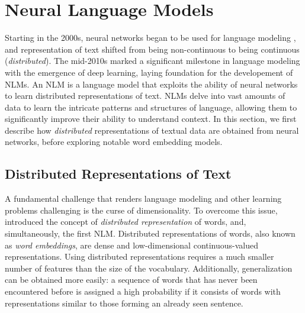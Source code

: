 \section{Neural Language Models}

Starting in the 2000s, neural networks began to be used for language modeling \citep{bengio2000neural}, and representation of text shifted from being non-continuous to being continuous (\textit{distributed}). The mid-2010s marked a significant milestone in language modeling with the emergence of deep learning, laying foundation for the developement of \acp{NLM}. An \ac{NLM} is a language model that exploits the ability of neural networks to learn distributed representations of text. \acp{NLM} delve into vast amounts of data to learn the intricate patterns and structures of language, allowing them to significantly improve their ability to understand context. In this section, we first describe how \textit{distributed} representations of textual data are obtained from neural networks, before exploring notable word embedding models.




\subsection{Distributed Representations of Text}

A fundamental challenge that renders language modeling and other learning problems challenging is the curse of dimensionality. To overcome this issue, \citet{bengio2000neural} introduced the concept of \textit{distributed representation} of words, and, simultaneously, the first \ac{NLM}. Distributed representations of words, also known as \textit{word embeddings}, are dense and low-dimensional continuous-valued representations. Using distributed representations requires a much smaller number of features than the size of the vocabulary. Additionally, generalization can be obtained more easily: a sequence of words that has never been encountered before is assigned a high probability if it consists of words with representations similar to those forming an already seen sentence. 

